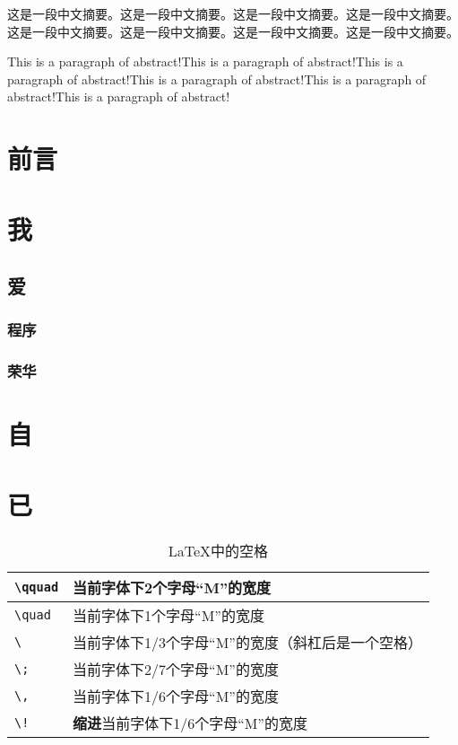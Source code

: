 \documentclass[a4paper,AutoFakeBold,12pt,twoside]{ahputhesis}
\begin{document}
\pagestyle{frontmatter}
\begin{cnabstract}
这是一段中文摘要。这是一段中文摘要。这是一段中文摘要。这是一段中文摘要。这是一段中文摘要。这是一段中文摘要。这是一段中文摘要。这是一段中文摘要。
\end{cnabstract}
\begin{enabstract}
This is a paragraph of abstract!This is a paragraph of abstract!This is a paragraph of abstract!This is a paragraph of abstract!This is a paragraph of abstract!This is a paragraph of abstract!
\end{enabstract}
\tableofcontents
\listoffigures
\listoftables
\newpage
\pagestyle{mainmatter}
\chapter*{前言}
\chapter{我}
\section{爱}
\subsection{程序}
\subsection{荣华}
\chapter{自}
\chapter{已}
\begin{table}
    \centering
    \caption{\LaTeX{}中的空格}
    \label{tab-space}
    \begin{tabular}{l|l}
        \hline
        \verb|\qquad| & 当前字体下2个字母“M”的宽度 \\ \hline
        \verb|\quad|  & 当前字体下1个字母“M”的宽度 \\ \hline
        \verb|\ |     & 当前字体下1/3个字母“M”的宽度（斜杠后是一个空格） \\ \hline
        \verb|\;|     & 当前字体下2/7个字母“M”的宽度 \\ \hline
        \verb|\,|     & 当前字体下1/6个字母“M”的宽度 \\ \hline
        \verb|\!|     & {\bf 缩进}当前字体下1/6个字母“M”的宽度 \\ \hline
    \end{tabular}
\end{table}
\end{document}
